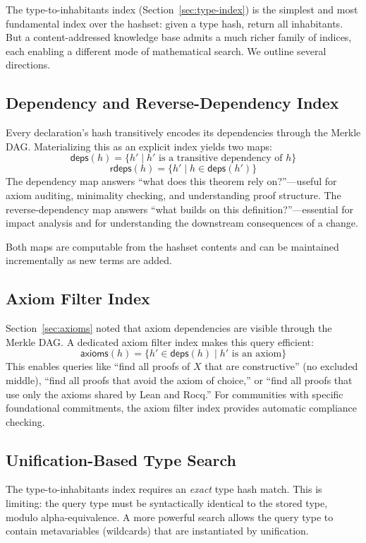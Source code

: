 \documentclass[11pt]{article}
\theoremstyle{definition}
\theoremstyle{plain}
\theoremstyle{remark}
\begin{document}
The type-to-inhabitants index (Section~\ref{sec:type-index}) is the simplest
and most fundamental index over the hashset: given a type hash, return all inhabitants.
But a content-addressed knowledge base admits a much richer family of indices, each
enabling a different mode of mathematical search.
We outline several directions.

\subsection{Dependency and Reverse-Dependency Index}
\label{sec:dep-index}

Every declaration's hash transitively encodes its dependencies through the Merkle DAG.
Materializing this as an explicit index yields two maps:
\[
  \textsf{deps}(h) = \{ h' \mid h' \text{ is a transitive dependency of } h \}
\]
\[
  \textsf{rdeps}(h) = \{ h' \mid h \in \textsf{deps}(h') \}
\]
The dependency map answers ``what does this theorem rely on?''---useful for
axiom auditing, minimality checking, and understanding proof structure.
The reverse-dependency map answers ``what builds on this definition?''---essential
for impact analysis and for understanding the downstream consequences of a change.

Both maps are computable from the hashset contents and can be maintained incrementally
as new terms are added.

\subsection{Axiom Filter Index}
\label{sec:axiom-index}

Section~\ref{sec:axioms} noted that axiom dependencies are visible through the Merkle DAG.
A dedicated axiom filter index makes this query efficient:
\[
  \textsf{axioms}(h) = \{ h' \in \textsf{deps}(h) \mid h' \text{ is an axiom} \}
\]
This enables queries like ``find all proofs of $X$ that are constructive'' (no excluded middle),
``find all proofs that avoid the axiom of choice,'' or ``find all proofs
that use only the axioms shared by Lean and Rocq.''
For communities with specific foundational commitments, the axiom filter index
provides automatic compliance checking.

\subsection{Unification-Based Type Search}
\label{sec:unification-index}

The type-to-inhabitants index requires an \emph{exact} type hash match.
This is limiting: the query type must be syntactically identical to the stored type,
modulo alpha-equivalence.
A more powerful search allows the query type to contain metavariables
(wildcards) that are instantiated by unification.
\end{document}
